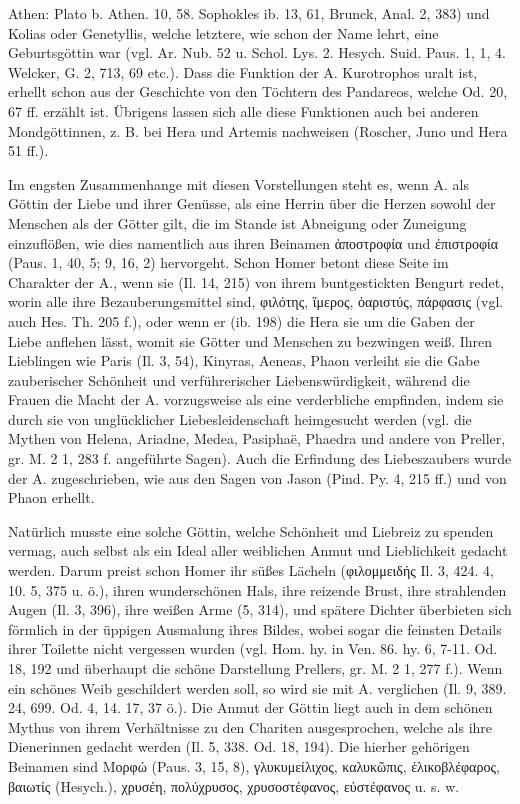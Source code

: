 \documentclass[a4paper, 11pt, oneside]{article}
\begin{document}
Athen: Plato b. Athen. 10, 58. Sophokles ib. 13, 61, Brunck, Anal. 2, 383) und Kolias oder Genetyllis, welche letztere, wie schon der Name lehrt, eine Geburtsgöttin war (vgl. Ar. Nub. 52 u. Schol. Lys. 2. Hesych. Suid. Paus. 1, 1, 4. Welcker, G. 2, 713, 69 etc.). Dass die Funktion der A. Kurotrophos uralt ist, erhellt schon aus der Geschichte von den Töchtern des Pandareos, welche Od. 20, 67 ff. erzählt ist. Übrigens lassen sich alle diese Funktionen auch bei anderen Mondgöttinnen, z. B. bei Hera und Artemis nachweisen (Roscher, Juno und Hera 51 ff.).

Im engsten Zusammenhange mit diesen Vorstellungen steht es, wenn A. als Göttin der Liebe und ihrer Genüsse, als eine Herrin über die Herzen sowohl der Menschen als der Götter gilt, die im Stande ist Abneigung oder Zuneigung einzuflößen, wie dies namentlich aus ihren Beinamen ἀποστροφία und ἐπιστροφία (Paus. 1, 40, 5; 9, 16, 2) hervorgeht. Schon Homer betont diese Seite im Charakter der A., wenn sie (Il. 14, 215) von ihrem buntgestickten Bengurt redet, worin alle ihre Bezauberungsmittel sind, φιλότης, ἵμερος, ὀαριστύς, πάρφασις (vgl. auch Hes. Th. 205 f.), oder wenn er (ib. 198) die Hera sie um die Gaben der Liebe anflehen lässt, womit sie Götter und Menschen zu bezwingen weiß. Ihren Lieblingen wie Paris (Il. 3, 54), Kinyras, Aeneas, Phaon verleiht sie die Gabe zauberischer Schönheit und verführerischer Liebenswürdigkeit, während die Frauen die Macht der A. vorzugsweise als eine verderbliche empfinden, indem sie durch sie von unglücklicher Liebesleidenschaft heimgesucht werden (vgl. die Mythen von Helena, Ariadne, Medea, Pasiphaë, Phaedra und andere von Preller, gr. M. 2 1, 283 f. angeführte Sagen). Auch die Erfindung des Liebeszaubers wurde der A. zugeschrieben, wie aus den Sagen von Jason (Pind. Py. 4, 215 ff.) und von Phaon erhellt.

Natürlich musste eine solche Göttin, welche Schönheit und Liebreiz zu spenden vermag, auch selbst als ein Ideal aller weiblichen Anmut und Lieblichkeit gedacht werden. Darum preist schon Homer ihr süßes Lächeln (φιλομμειδής Il. 3, 424. 4, 10. 5, 375 u. ö.), ihren wunderschönen Hals, ihre reizende Brust, ihre strahlenden Augen (Il. 3, 396), ihre weißen Arme (5, 314), und spätere Dichter überbieten sich förmlich in der üppigen Ausmalung ihres Bildes, wobei sogar die feinsten Details ihrer Toilette nicht vergessen wurden (vgl. Hom. hy. in Ven. 86. hy. 6, 7-11. Od. 18, 192 und überhaupt die schöne Darstellung Prellers, gr. M. 2 1, 277 f.). Wenn ein schönes Weib geschildert werden soll, so wird sie mit A. verglichen (Il. 9, 389. 24, 699. Od. 4, 14. 17, 37 ö.). Die Anmut der Göttin liegt auch in dem schönen Mythus von ihrem Verhältnisse zu den Chariten ausgesprochen, welche als ihre Dienerinnen gedacht werden (Il. 5, 338. Od. 18, 194). Die hierher gehörigen Beinamen sind Μορφώ (Paus. 3, 15, 8), γλυκυμείλιχος, καλυκῶπις, ἑλικοβλέφαρος, βαιωτίς (Hesych.), χρυσέη, πολύχρυσος, χρυσοστέφανος, εὐστέφανος u. s. w.
\end{document}

